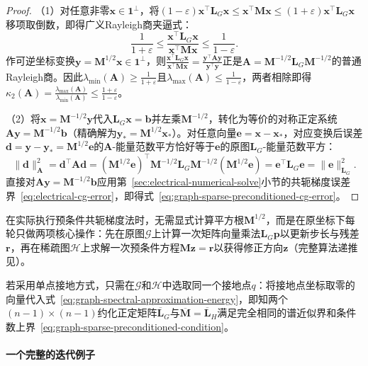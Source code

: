 \begin{proof}
（1）对任意非零$\bm x\in\bm 1^\perp$，将$(1-\varepsilon)\bm x^\top\bm L_G\bm x\leq\bm x^\top\bm M\bm x\leq(1+\varepsilon)\bm x^\top\bm L_G\bm x$移项取倒数，即得广义Rayleigh商夹逼式：
\begin{equation}
\frac{1}{1+\varepsilon}
\leq
\frac{\bm x^\top\bm L_G\bm x}{\bm x^\top\bm M\bm x}
\leq
\frac{1}{1-\varepsilon}.
\label{eq:graph-sparse-preconditioned-rayleigh}
\end{equation}
作可逆坐标变换$\bm y=\bm M^{1/2}\bm x\in\bm 1^\perp$，则$\frac{\bm x^\top\bm L_G\bm x}{\bm x^\top\bm M\bm x}=\frac{\bm y^\top\bm A\bm y}{\bm y^\top\bm y}$正是$\bm A=\bm M^{-1/2}\bm L_G\bm M^{-1/2}$的普通Rayleigh商。因此$\lambda_{\min}(\bm A)\geq\frac{1}{1+\varepsilon}$且$\lambda_{\max}(\bm A)\leq\frac{1}{1-\varepsilon}$，两者相除即得$\kappa_2(\bm A)=\frac{\lambda_{\max}(\bm A)}{\lambda_{\min}(\bm A)}\leq\frac{1+\varepsilon}{1-\varepsilon}$。

（2）将$\bm x=\bm M^{-1/2}\bm y$代入$\bm L_G\bm x=\bm b$并左乘$\bm M^{-1/2}$，转化为等价的对称正定系统$\bm A\bm y=\bm M^{-1/2}\bm b$（精确解为$\bm y_*=\bm M^{1/2}\bm x_*$）。对任意向量$\bm e=\bm x-\bm x_*$，对应变换后误差$\bm d=\bm y-\bm y_*=\bm M^{1/2}\bm e$的$\bm A$-能量范数平方恰好等于$\bm e$的原图$\bm L_G$-能量范数平方：
\[
  \lVert\bm d\rVert_{\bm A}^2=\bm d^\top\bm A\bm d=(\bm M^{1/2}\bm e)^\top\bm M^{-1/2}\bm L_G\bm M^{-1/2}(\bm M^{1/2}\bm e)=\bm e^\top\bm L_G\bm e=\lVert\bm e\rVert_{\bm L_G}^2.
\]
直接对$\bm A\bm y=\bm M^{-1/2}\bm b$应用第~\ref{sec:electrical-numerical-solve}小节的共轭梯度误差界~\eqref{eq:electrical-cg-error}，即得式~\eqref{eq:graph-sparse-preconditioned-cg-error}。
\end{proof}

在实际执行预条件共轭梯度法时，无需显式计算平方根$\bm M^{1/2}$，而是在原坐标下每轮只做两项核心操作：先在原图$\mathcal G$上计算一次矩阵向量乘法$\bm L_G\bm p$以更新步长与残差$\bm r$，再在稀疏图$\mathcal H$上求解一次预条件方程$\bm M\bm z=\bm r$以获得修正方向$\bm z$（完整算法递推见）。

若采用单点接地方式，只需在$\mathcal G$和$\mathcal H$中选取同一个接地点$q$：将接地点坐标取零的向量代入式~\eqref{eq:graph-spectral-approximation-energy}，即知两个$(n-1)\times(n-1)$约化正定矩阵$\overline{\bm L}_G$与$\overline{\bm M}=\overline{\bm L}_H$满足完全相同的谱近似界和条件数上界~\eqref{eq:graph-sparse-preconditioned-condition}。

\paragraph{一个完整的迭代例子}

